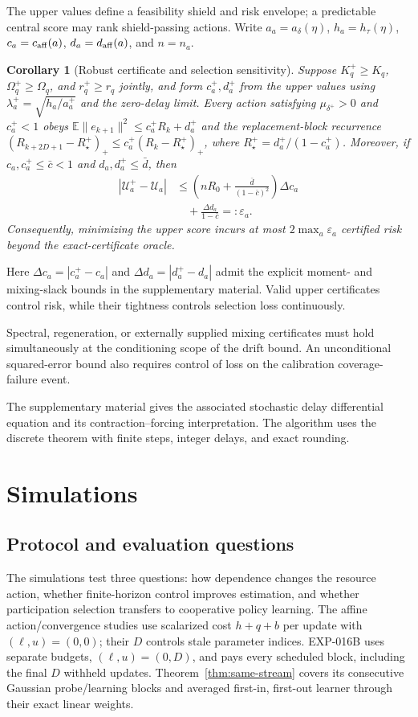 \documentclass[journal]{IEEEtran}
\newtheorem{corollary}{Corollary}
\newcommand{\E}{\mathbb{E}}
\begin{document}
The upper values define a feasibility shield and risk envelope; a predictable central score may rank shield-passing actions.
Write $a_a=a_\delta(\eta)$, $h_a=h_\tau(\eta)$, $c_a=c_{\rm aff}(a)$, $d_a=d_{\rm aff}(a)$, and $n=n_a$.

\begin{corollary}[Robust certificate and selection sensitivity]
Suppose $K_q^+\ge K_q$, $\Omega_q^+\ge\Omega_q$, and $r_q^+\ge r_q$ jointly, and form $c_a^+,d_a^+$ from the upper values using $\lambda_a^+=\sqrt{h_a/a_a^+}$ and the zero-delay limit.
Every action satisfying $\mu_{\delta^+}>0$ and $c_a^+<1$ obeys $\E\|e_{k+1}\|^2\le c_a^+R_k+d_a^+$ and the replacement-block recurrence $(R_{k+2D+1}-R_\star^+)_+\le c_a^+(R_k-R_\star^+)_+$, where $R_\star^+=d_a^+/(1-c_a^+)$.
Moreover, if $c_a,c_a^+\le\bar c<1$ and $d_a,d_a^+\le\bar d$, then
\begin{align}
|\mathcal U_a^+-\mathcal U_a|
&\le\left(nR_0+\frac{\bar d}{(1-\bar c)^2}\right)\Delta c_a\nonumber\\
&\quad+\frac{\Delta d_a}{1-\bar c}=: \varepsilon_a.
\label{eq:robust-score-gap}
\end{align}
Consequently, minimizing the upper score incurs at most $2\max_a\varepsilon_a$ certified risk beyond the exact-certificate oracle.
\label{cor:robust-certificate}
\end{corollary}

Here $\Delta c_a=|c_a^+-c_a|$ and $\Delta d_a=|d_a^+-d_a|$ admit the explicit moment- and mixing-slack bounds in the supplementary material.
Valid upper certificates control risk, while their tightness controls selection loss continuously.

Spectral, regeneration, or externally supplied mixing certificates must hold simultaneously at the conditioning scope of the drift bound.
An unconditional squared-error bound also requires control of loss on the calibration coverage-failure event.

The supplementary material gives the associated stochastic delay differential equation and its contraction--forcing interpretation.
The algorithm uses the discrete theorem with finite steps, integer delays, and exact rounding.

\section{Simulations}
\subsection{Protocol and evaluation questions}
The simulations test three questions: how dependence changes the resource action, whether finite-horizon control improves estimation, and whether participation selection transfers to cooperative policy learning.
The affine action/convergence studies use scalarized cost $h+q+b$ per update with $(\ell,u)=(0,0)$; their $D$ controls stale parameter indices.
EXP-016B uses separate budgets, $(\ell,u)=(0,D)$, and pays every scheduled block, including the final $D$ withheld updates.
Theorem~\ref{thm:same-stream} covers its consecutive Gaussian probe/learning blocks and averaged first-in, first-out learner through their exact linear weights.
\end{document}

